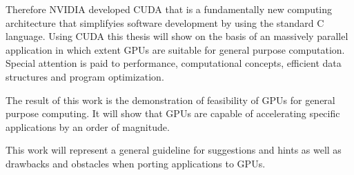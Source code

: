 Therefore NVIDIA developed CUDA that is a fundamentally new computing 
architecture that simplifyies software development by using the standard C 
language. Using CUDA this thesis will show on the basis of an massively parallel 
application in which extent GPUs are suitable for general purpose computation. 
Special attention is paid to performance, computational concepts, efficient data 
structures and program optimization. 

The result of this work is the demonstration of feasibility of GPUs for general
purpose computing. It will show that GPUs are capable of accelerating specific
applications by an order of magnitude. 

This work will represent a general guideline for suggestions and hints as 
well as drawbacks and obstacles when porting applications to GPUs.

\endgroup			

\vfill